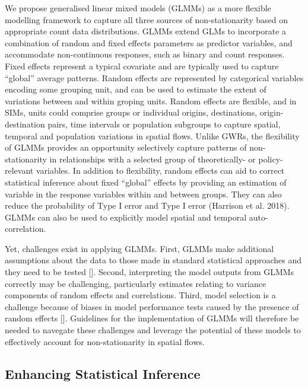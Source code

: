 \documentclass[11pt,letterpaper]{article}
\begin{document}
We propose generalised linear mixed models (GLMMs) as a more flexible modelling framework to capture all three sources of non-stationarity based on appropriate count data distributions.
GLMMs extend GLMs to incorporate a combination of random and fixed effects parameters as predictor variables, and accommodate non-continuous responses, such as binary and count responses.
Fixed effects represent a typical covariate and are typically used to capture ``global'' average patterns.
Random effects are represented by categorical variables encoding some grouping unit, and can be used to estimate the extent of variations between and within groping units.
Random effects are flexible, and in SIMs, units could comprise groups or individual origins, destinations, origin-destination pairs, time intervals or population subgroups to capture spatial, temporal and population variations in spatial flows.
Unlike GWRs, the flexibility of GLMMs provides an opportunity selectively capture patterns of non-stationarity in relationships with a selected group of theoretically- or policy-relevant variables.
In addition to flexibility, random effects can aid to correct statistical inference about fixed ``global'' effects by providing an estimation of variable in the response variables within and between groups.
They can also reduce the probability of Type I error and Type I error (Harrison et al. 2018).
GLMMs can also be used to explicitly model spatial and temporal auto-correlation.

Yet, challenges exist in applying GLMMs.
First, GLMMs make additional assumptions about the data to those made in standard statistical approaches and they need to be tested {[}{]}.
Second, interpreting the model outputs from GLMMs correctly may be challenging, particularly estimates relating to variance components of random effects and correlations.
Third, model selection is a challenge because of biases in model performance tests caused by the presence of random effects {[}{]}.
Guidelines for the implementation of GLMMs will therefore be needed to navegate these challenges and leverage the potential of these models to effectively account for non-stationarity in spatial flows.

\hypertarget{enhancing-statistical-inference}{%
\subsection{\texorpdfstring{Enhancing Statistical Inference }{Enhancing Statistical Inference }}\label{enhancing-statistical-inference}}
\end{document}
